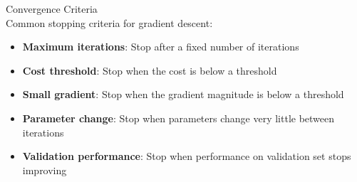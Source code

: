 \begin{concept}{Convergence Criteria}\\
Common stopping criteria for gradient descent:
\begin{itemize}
    \item \textbf{Maximum iterations}: Stop after a fixed number of iterations
    \item \textbf{Cost threshold}: Stop when the cost is below a threshold
    \item \textbf{Small gradient}: Stop when the gradient magnitude is below a threshold
    \item \textbf{Parameter change}: Stop when parameters change very little between iterations
    \item \textbf{Validation performance}: Stop when performance on validation set stops improving
\end{itemize}
\end{concept}